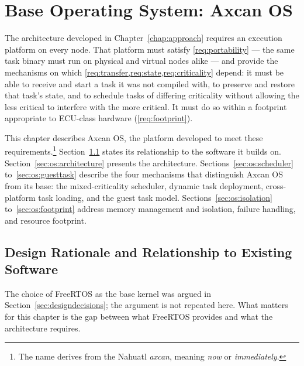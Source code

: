 %

\chapter{Base Operating System: Axcan OS}\label{chap:os}

The architecture developed in Chapter~\ref{chap:approach} requires an
execution platform on every node. That platform must satisfy
\cref{req:portability} --- the same task binary must run on physical and
virtual nodes alike --- and provide the mechanisms on which
\cref{req:transfer,req:state,req:criticality} depend: it must be able to
receive and start a task it was not compiled with, to preserve and restore
that task's state, and to schedule tasks of differing criticality without
allowing the less critical to interfere with the more critical. It must do so
within a footprint appropriate to ECU-class hardware
(\cref{req:footprint}).

This chapter describes Axcan OS, the platform developed to meet these
requirements.\footnote{The name derives from the Nahuatl \textit{axcan},
meaning \emph{now} or \emph{immediately}.} Section~\ref{sec:os:rationale}
states its relationship to the software it builds on.
Section~\ref{sec:os:architecture} presents the architecture.
Sections~\ref{sec:os:scheduler} to~\ref{sec:os:guesttask} describe the four
mechanisms that distinguish Axcan OS from its base: the mixed-criticality
scheduler, dynamic task deployment, cross-platform task loading, and the guest
task model. Sections~\ref{sec:os:isolation} to~\ref{sec:os:footprint} address
memory management and isolation, failure handling, and resource footprint.

\section{Design Rationale and Relationship to Existing Software}
\label{sec:os:rationale}

The choice of FreeRTOS as the base kernel was argued in
Section~\ref{sec:designdecisions}; the argument is not repeated here. What
matters for this chapter is the gap between what FreeRTOS provides and what
the architecture requires.

